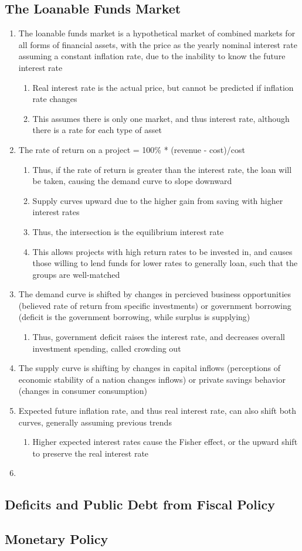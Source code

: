 \documentclass[11 pt, twoside]{article}
\begin{document}
\subsection{The Loanable Funds Market}
\begin{enumerate}
\item The loanable funds market is a hypothetical market of combined markets for all forms of financial assets, with the price as the yearly nominal interest rate assuming a constant inflation rate, due to the inability to know the future interest rate
\begin{enumerate}
\item Real interest rate is the actual price, but cannot be predicted if inflation rate changes
\item This assumes there is only one market, and thus interest rate, although there is a rate for each type of asset
\end{enumerate}
\item The rate of return on a project = 100\% * (revenue - cost)/cost
\begin{enumerate}
\item Thus, if the rate of return is greater than the interest rate, the loan will be taken, causing the demand curve to slope downward
\item Supply curves upward due to the higher gain from saving with higher interest rates
\item Thus, the intersection is the equilibrium interest rate
\item This allows projects with high return rates to be invested in, and causes those willing to lend funds for lower rates to generally loan, such that the groups are well-matched
\end{enumerate}
\item The demand curve is shifted by changes in percieved business opportunities (believed rate of return from specific investments) or government borrowing (deficit is the government borrowing, while surplus is supplying)
\begin{enumerate}
\item Thus, government deficit raises the interest rate, and decreases overall investment spending, called crowding out
\end{enumerate}
\item The supply curve is shifting by changes in capital inflows (perceptions of economic stability of a nation changes inflows) or private savings behavior (changes in consumer consumption)
\item Expected future inflation rate, and thus real interest rate, can also shift both curves, generally assuming previous trends
\begin{enumerate}
\item Higher expected interest rates cause the Fisher effect, or the upward shift to preserve the real interest rate
\end{enumerate}
\item 
\end{enumerate}

\subsection{Deficits and Public Debt from Fiscal Policy}
\subsection{Monetary Policy}
\end{document}
